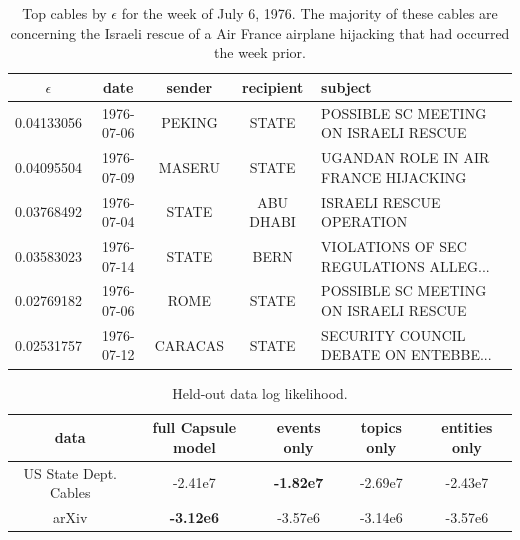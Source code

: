 \begin{table}
\centering
\begin{tabular}{ccccl}
\toprule
$\epsilon$ & date & sender & recipient & subject \\
\midrule
0.04133056 & 1976-07-06 & PEKING & STATE & POSSIBLE SC MEETING ON ISRAELI RESCUE \\
0.04095504 & 1976-07-09 & MASERU & STATE & UGANDAN ROLE IN AIR FRANCE HIJACKING \\
0.03768492 & 1976-07-04 & STATE & ABU DHABI & ISRAELI RESCUE OPERATION \\
0.03583023 & 1976-07-14 & STATE & BERN & VIOLATIONS OF SEC REGULATIONS ALLEG... \\
0.02769182 & 1976-07-06 & ROME & STATE & POSSIBLE SC MEETING ON ISRAELI RESCUE \\ %
0.02531757 & 1976-07-12 & CARACAS & STATE & SECURITY COUNCIL DEBATE ON ENTEBBE...\\%
\bottomrule
\end{tabular}
\label{tab:entebbe}
\caption{Top cables by $\epsilon$ for the week of July 6, 1976.  The majority of these cables are concerning the Israeli rescue of a Air France airplane hijacking that had occurred the week prior.}
\end{table}




\begin{table}
\centering
\begin{tabular}{ccccc}
\toprule
data & full Capsule model & events only & topics only & entities only \\
\midrule
US State Dept. Cables & -2.41e7 & \textbf{-1.82e7} & -2.69e7 & -2.43e7 \\
arXiv & \textbf{-3.12e6} & -3.57e6 & -3.14e6 & -3.57e6 \\
\bottomrule
\end{tabular}
\label{tab:loglikelihood}
\caption{Held-out data log likelihood.}
\end{table}

